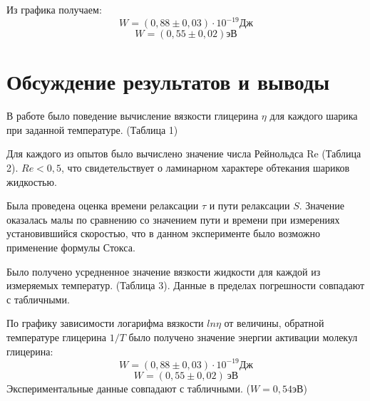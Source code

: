 \documentclass[a4paper,12pt]{article}
\theoremstyle{plain} %
\theoremstyle{definition} %
\theoremstyle{remark} %
\begin{document}
Из графика получаем:
\[W = (0,88\pm0,03)\cdot 10^{-19} \text{Дж} \]
\[W = (0,55\pm0,02)\text{эВ}\]

\section{Обсуждение результатов и выводы}
В работе было поведение вычисление вязкости глицерина $\eta$ для каждого шарика при заданной температуре. (Таблица 1)

Для каждого из опытов было вычислено значение числа Рейнольдса Re (Таблица 2). $Re<0,5$, что свидетельствует о ламинарном характере обтекания шариков жидкостью. 

Была проведена оценка времени релаксации $\tau$ и пути релаксации $S$. Значение оказалась малы по сравнению со значением пути и времени при измерениях установившийся скоростью, что в данном эксперименте было возможно применение формулы Стокса.

Было получено усредненное значение вязкости жидкости для каждой из измеряемых температур. (Таблица 3). Данные в пределах погрешности совпадают с табличными.

По графику зависимости логарифма вязкости $ln \eta$ от величины, обратной температуре глицерина $1/T$ было получено значение энергии активации молекул глицерина:
\[W = (0,88\pm0,03)\cdot 10^{-19} \text{Дж} \]
\[W = (0,55\pm0,02)\ \text{эВ}\]
Экспериментальные данные совпадают с табличными. ($W = 0,54\text{эВ}$)
	
	
\end{document}
